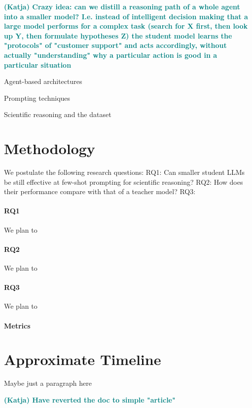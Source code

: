 \documentclass{article}
\newcommand{\katja}[1]{\textbf{\textcolor{teal}{(Katja) #1}}}
\begin{document}
\katja{Crazy idea: can we distill a reasoning path of a whole agent into a smaller model? I.e. instead of intelligent decision making that a large model performs for a complex task (search for X first, then look up Y, then formulate hypotheses Z) the student model learns the "protocols" of "customer support" and acts accordingly, without actually "understanding" why a particular action is good in a particular situation}

Agent-based architectures \cite{lin2024swiftsage} \cite{ghafarollahi2024sciagents}

Prompting techniques \cite{schulhoff2024prompt}

Scientific reasoning and the dataset \cite{lu2022learn}

\section{Methodology}
We postulate the following research questions: 
RQ1: Can smaller student LLMs be still effective at few-shot prompting for scientific reasoning?
RQ2: How does their performance compare with that of a teacher model?
RQ3: 
\paragraph{RQ1} 
We plan to 

\paragraph{RQ2}
We plan to

\paragraph{RQ3}
We plan to

\paragraph{Metrics}

\section{Approximate Timeline}
Maybe just a paragraph here


\katja{Have reverted the doc to simple "article"}



\end{document}
